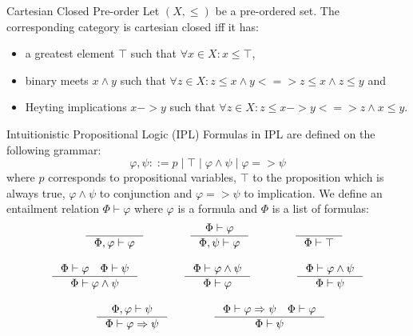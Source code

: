 \pagebreak

\begin{definition}{Cartesian Closed Pre-order}
    Let $(X, \le)$ be a pre-ordered set.
    The corresponding category is cartesian closed iff it has:
    \begin{itemize}
        \item a greatest element $\top$ such that $\forall x \in X: x \le \top$,
        \item binary meets $x \land y$ such that $\forall z \in X: z \le x \land y <=> z \le x \land z \le y$ and
        \item Heyting implications $x -> y$ such that $\forall z \in X: z \le x -> y <=> z \land x \le y$.
    \end{itemize}
\end{definition}

\begin{definition}{Intuitionistic Propositional Logic (IPL)}
    Formulas in IPL are defined on the following grammar:
    \[\varphi, \psi ::= p \mid \top \mid \varphi \land \psi \mid \varphi => \psi\]
    where $p$ corresponds to propositional variables, $\top$ to the proposition which is always true,
    $\varphi \land \psi$ to conjunction and $\varphi => \psi$ to implication.
    We define an entailment relation $\Phi \vdash \varphi$ where $\varphi$ is a formula and $\Phi$ is a list of formulas:
    \begin{align*}
        & \qquad\quad \inference{}{\Phi, \varphi \vdash \varphi}\qquad\qquad
        \inference{\Phi \vdash \varphi}{\Phi, \psi \vdash \varphi}\qquad\qquad
        \inference{}{\Phi \vdash \top}\\[1em]
        & \inference{\Phi \vdash \varphi \quad \Phi \vdash \psi}{\Phi \vdash \varphi \land \psi}\qquad\qquad
        \inference{\Phi \vdash \varphi \land \psi}{\Phi \vdash \varphi}\qquad\qquad
        \inference{\Phi \vdash \varphi \land \psi}{\Phi \vdash \psi}\\[1em]
        & \qquad\qquad \inference{\Phi, \varphi \vdash \psi}{\Phi \vdash \varphi => \psi}\qquad\qquad
        \inference{\Phi \vdash \varphi => \psi \quad \Phi \vdash \varphi}{\Phi \vdash \psi}
    \end{align*}
\end{definition}

